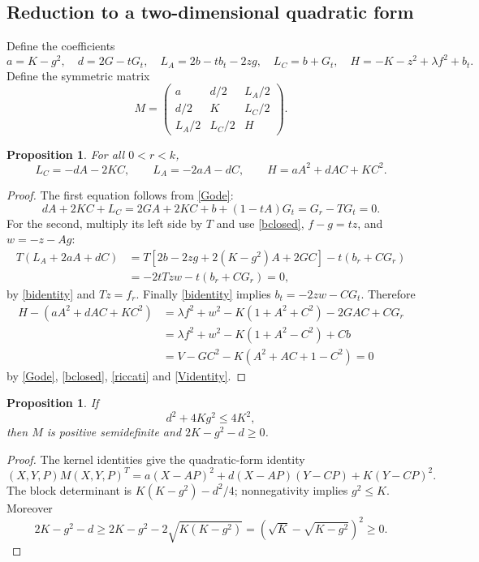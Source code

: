 \documentclass[11pt,letterpaper,reqno]{amsart}
\newtheorem{proposition}[theorem]{Proposition}
\theoremstyle{definition}
\begin{document}
\subsection{Reduction to a two-dimensional quadratic form}
Define the coefficients
\[
 a=K-g^2,\quad d=2G-tG_t,\quad
 L_A=2b-tb_t-2zg,\quad L_C=b+G_t,\quad
 H=-K-z^2+\lambda f^2+b_t.
\]
Define the symmetric matrix
\[
 M=\begin{pmatrix}
 a&d/2&L_A/2\\ d/2&K&L_C/2\\L_A/2&L_C/2&H
 \end{pmatrix}.
\]
\begin{proposition}\label{kernel}
For all $0<r<k$,
\[
 L_C=-dA-2KC,\qquad L_A=-2aA-dC,\qquad
 H=aA^2+dAC+KC^2.
\]

\end{proposition}
\begin{proof}
The first equation follows from \eqref{Gode}:
\[
 dA+2KC+L_C=2GA+2KC+b+(1-tA)G_t
                    =G_r-TG_t=0.
\]
For the second, multiply its left side by $T$ and use
\eqref{bclosed}, $f-g=tz$, and $w=-z-Ag$:
\begin{align*}
 T(L_A+2aA+dC)
 &=T[2b-2zg+2(K-g^2)A+2GC]-t(b_r+CG_r)\\
 &=-2tTzw-t(b_r+CG_r)=0,
\end{align*}
by \eqref{bidentity} and $Tz=f_r$.
Finally \eqref{bidentity} implies $b_t=-2zw-CG_t$. Therefore
\begin{align*}
 H-(aA^2+dAC+KC^2)
 &=\lambda f^2+w^2-K(1+A^2+C^2)-2GAC+CG_r\\
 &=\lambda f^2+w^2-K(1+A^2-C^2)+Cb\\
 &=V-GC^2-K(A^2+AC+1-C^2)=0
\end{align*}
by \eqref{Gode}, \eqref{bclosed}, \eqref{riccati} and
\eqref{Videntity}.
\end{proof}

\begin{proposition}\label{prop:reduction}
If
\begin{equation}\label{remaining-positivity}
 d^2+4Kg^2\le4K^2,
\end{equation}
then $M$ is positive semidefinite and $2K-g^2-d\ge0$.
\end{proposition}
\begin{proof}
The kernel identities give the quadratic-form identity
\[
 (X,Y,P)M(X,Y,P)^T
 =a(X-AP)^2+d(X-AP)(Y-CP)+K(Y-CP)^2.
\]
The block determinant is $K(K-g^2)-d^2/4$; nonnegativity implies
$g^2\le K$. Moreover
\[
 2K-g^2-d\ge2K-g^2-2\sqrt{K(K-g^2)}
            =\left(\sqrt K-\sqrt{K-g^2}\right)^2\ge0.
\]
\end{proof}
\end{document}
